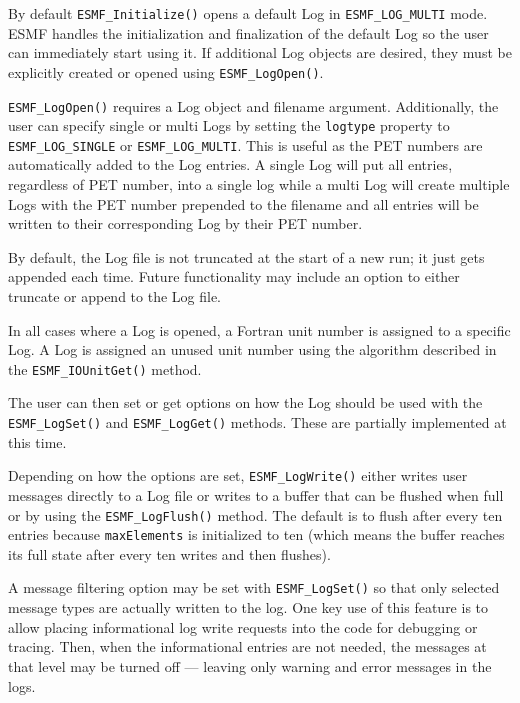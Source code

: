 

By default {\tt ESMF\_Initialize()} opens a default Log in 
{\tt ESMF\_LOG\_MULTI} mode. ESMF handles the initialization and finalization
of the default Log so the user can immediately start using it. If additional Log
objects are desired, they must be explicitly created or opened using
{\tt ESMF\_LogOpen()}.

{\tt ESMF\_LogOpen()} requires a Log object and filename argument. Additionally,
the user can specify single or multi Logs by setting the {\tt logtype} property
to {\tt ESMF\_LOG\_SINGLE} or {\tt ESMF\_LOG\_MULTI}.
This is useful as the PET numbers are automatically added to the Log entries.
A single Log will put all entries, regardless of PET number, into a single
log while a multi Log will create multiple Logs with the PET number prepended
to the filename and all entries will be written to their corresponding Log 
by their PET number.
 
By default, the Log file is not truncated at the start of a new run; it just
gets appended each time.  Future functionality may include an option to
either truncate or append to the Log file. 

In all cases where a Log is opened, a Fortran unit number is assigned to a specific
Log.  A Log is assigned an unused unit number using the algorithm described in
the {\tt ESMF\_IOUnitGet()} method.

The user can then set or get options on how the Log should be used 
with the {\tt ESMF\_LogSet()} and {\tt ESMF\_LogGet()} methods.  These are 
partially implemented at this time. 

Depending on how the options are set, {\tt ESMF\_LogWrite()} either writes user
messages directly to a Log file or writes to a buffer that can be flushed when 
full or by using the {\tt ESMF\_LogFlush()} method.  The default is to flush 
after every ten entries because {\tt maxElements} is initialized to ten 
(which means the buffer reaches its full state after every ten writes and then
flushes).

A message filtering option may be set with {\tt ESMF\_LogSet()} so
that only selected message types are actually written to the log.  One key
use of this feature is to allow placing informational log write requests
into the code for debugging or tracing.  Then, when the informational entries
are not needed, the messages at that level may be turned off --- leaving only
warning and error messages in the logs. 

